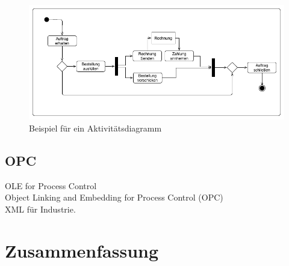 \begin{displayquote}
\begin{figure}[hbt!]
 \centering
  \includegraphics[width=1\textwidth]{graphics/stateoftheart/Activity_bsp}
  \caption{Beispiel für ein Aktivitätsdiagramm}
\end{figure}
%
\subsection{OPC}
OLE for Process Control\\
Object Linking and Embedding for Process Control (OPC)\\
XML für Industrie. 
\newpage
\section{Zusammenfassung}


\end{displayquote}
